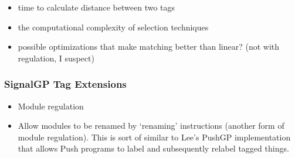 \begin{itemize}
\item time to calculate distance between two tags
\item the computational complexity of selection techniques
\item possible optimizations that make matching better than linear?
(not with regulation, I suspect)
\end{itemize}

\subsubsection{SignalGP Tag Extensions}

\begin{itemize}
  \item Module regulation
  \item Allow modules to be renamed by `renaming' instructions (another form of
        module regulation). This is sort of similar to Lee's PushGP implementation
        that allows Push programs to label and subsequently relabel tagged things.
\end{itemize}
